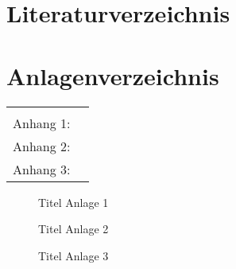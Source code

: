 \documentclass[a4paper, 11pt]{article}
\begin{document}
\section*{Literaturverzeichnis}
\renewcommand\refname{}
\printbibliography
\newpage

\section*{Anlagenverzeichnis}
\captionsetup[figure]{list=no}
\setcounter{figure}{0}
\renewcommand{\figurename}{Anhang}
\renewcommand{\thefigure}{\arabic{figure}}

\renewcommand\tabularxcolumn[1]{b{#1}}
\renewcommand*{\arraystretch}{1.5}
\begin{tabularx}{\textwidth}{Xr}
\multicolumn{2}{c}{}\\
Anhang 1: \nameref{Anhang:1} \dotfill&\pageref{Anhang:1}\\
Anhang 2: \nameref{Anhang:2} \dotfill&\pageref{Anhang:2}\\
Anhang 3: \nameref{Anhang:3} \dotfill&\pageref{Anhang:3}\\
\end{tabularx}
\newpage


\begin{figure}[!ht]
  \caption[Titel im Anlagenverzeichnis Anlage 1]{Titel Anlage 1}
  \label{Anhang:1}
  \centering
\end{figure}
\newpage


\begin{landscape}
  \begin{figure}[!ht]
    \caption[Titel im Anlagenverzeichnis Anlage 2]{Titel Anlage 2}
    \label{Anhang:2}
    \centering
  \end{figure}
  \end{landscape}
  \newpage


\begin{figure}[!ht]
  \caption[Titel im Anlagenverzeichnis Anlage 3]{Titel Anlage 3}
  \label{Anhang:3}
  \centering
\end{figure}
\newpage
\end{document}
